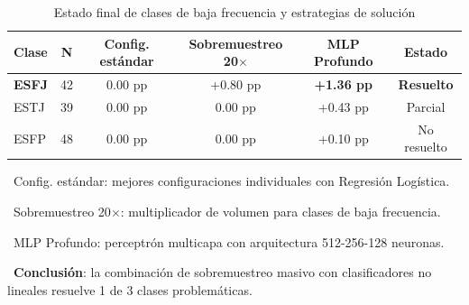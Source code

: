 \begin{table}[htbp]
\centering
\caption{Estado final de clases de baja frecuencia y estrategias de solución}
\label{tab:rare_class_summary}
\begin{tabular}{lccccc}
\toprule
\textbf{Clase} & \textbf{N} & \textbf{Config. estándar} & \textbf{Sobremuestreo 20$\times$} & \textbf{MLP Profundo} & \textbf{Estado} \\
\midrule
\rowcolor{green!20}
\textbf{ESFJ} & 42 & 0.00 pp & +0.80 pp & \textbf{+1.36 pp} & \textbf{Resuelto} \\
\rowcolor{yellow!20}
ESTJ & 39 & 0.00 pp & 0.00 pp & +0.43 pp & Parcial \\
\rowcolor{red!10}
ESFP & 48 & 0.00 pp & 0.00 pp & +0.10 pp & No resuelto \\
\bottomrule
\end{tabular}
\vspace{0.5em}\footnotesize

\textbullet\ Config. estándar: mejores configuraciones individuales con Regresión Logística.

\textbullet\ Sobremuestreo 20$\times$: multiplicador de volumen para clases de baja frecuencia.

\textbullet\ MLP Profundo: perceptrón multicapa con arquitectura 512-256-128 neuronas.

\textbullet\ \textbf{Conclusión}: la combinación de sobremuestreo masivo con clasificadores no lineales resuelve 1 de 3 clases problemáticas.

\end{table}
